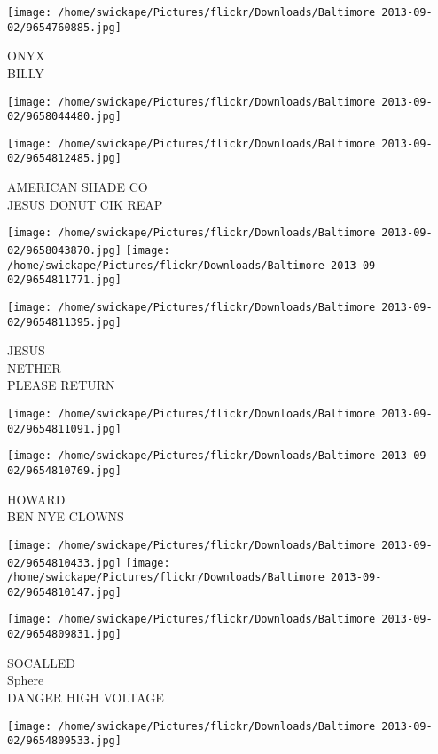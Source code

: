 \documentclass[10pt,letterpaper]{article}
\begin{document}
\vspace{0.25in}
\texttt{[image: /home/swickape/Pictures/flickr/Downloads/Baltimore 2013-09-02/9654760885.jpg]}

ONYX\\
BILLY
\pagebreak

\texttt{[image: /home/swickape/Pictures/flickr/Downloads/Baltimore 2013-09-02/9658044480.jpg]}

\vspace{0.25in}
\texttt{[image: /home/swickape/Pictures/flickr/Downloads/Baltimore 2013-09-02/9654812485.jpg]}

AMERICAN SHADE CO\\
JESUS DONUT CIK REAP
\pagebreak

\texttt{[image: /home/swickape/Pictures/flickr/Downloads/Baltimore 2013-09-02/9658043870.jpg]}
\texttt{[image: /home/swickape/Pictures/flickr/Downloads/Baltimore 2013-09-02/9654811771.jpg]}

\vspace{0.25in}
\texttt{[image: /home/swickape/Pictures/flickr/Downloads/Baltimore 2013-09-02/9654811395.jpg]}

JESUS\\
NETHER\\
PLEASE RETURN
\pagebreak

\texttt{[image: /home/swickape/Pictures/flickr/Downloads/Baltimore 2013-09-02/9654811091.jpg]}

\vspace{0.25in}
\texttt{[image: /home/swickape/Pictures/flickr/Downloads/Baltimore 2013-09-02/9654810769.jpg]}

HOWARD\\
BEN NYE CLOWNS
\pagebreak

\texttt{[image: /home/swickape/Pictures/flickr/Downloads/Baltimore 2013-09-02/9654810433.jpg]}
\texttt{[image: /home/swickape/Pictures/flickr/Downloads/Baltimore 2013-09-02/9654810147.jpg]}

\texttt{[image: /home/swickape/Pictures/flickr/Downloads/Baltimore 2013-09-02/9654809831.jpg]}

SOCALLED\\
Sphere\\
DANGER HIGH VOLTAGE
\pagebreak

\texttt{[image: /home/swickape/Pictures/flickr/Downloads/Baltimore 2013-09-02/9654809533.jpg]}
\end{document}
